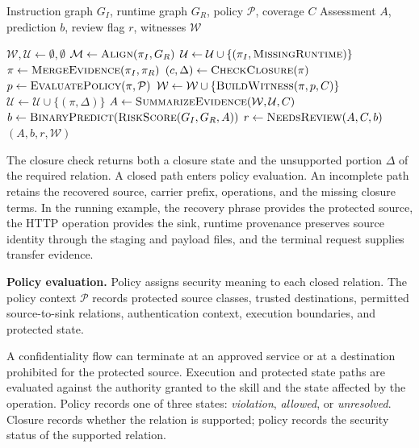 \begin{algorithm}[t]
\caption{\textsc{Adjudicate}$(G_I,G_R,\mathcal{P},C)$}
\label{alg:adjudication}
\footnotesize
\begin{algorithmic}[1]
\Require Instruction graph $G_I$, runtime graph $G_R$,
         policy $\mathcal{P}$, coverage $C$
\Ensure Assessment $A$, prediction $b$, review flag $r$,
        witnesses $\mathcal{W}$

\State $\mathcal{W},\mathcal{U} \gets \emptyset,\emptyset$
    \State $\mathcal{M} \gets \textsc{Align}(\pi_I,G_R)$
        \State $\mathcal{U} \gets \mathcal{U}\cup
        \{(\pi_I,\textsc{MissingRuntime})\}$
    \EndIf
        \State $\pi \gets \textsc{MergeEvidence}(\pi_I,\pi_R)$
        \State $(c,\Delta) \gets \textsc{CheckClosure}(\pi)$
            \State $p \gets \textsc{EvaluatePolicy}(\pi,\mathcal{P})$
            \State $\mathcal{W} \gets \mathcal{W}\cup
            \{\textsc{BuildWitness}(\pi,p,C)\}$
        \Else
            \State $\mathcal{U} \gets \mathcal{U}\cup\{(\pi,\Delta)\}$
        \EndIf
    \EndFor
\EndFor
\State $A \gets \textsc{SummarizeEvidence}(\mathcal{W},\mathcal{U},C)$
\State $b \gets \textsc{BinaryPredict}(\textsc{RiskScore}(G_I,G_R,A))$
\State $r \gets \textsc{NeedsReview}(A,C,b)$
\State \Return $(A,b,r,\mathcal{W})$
\end{algorithmic}
\end{algorithm}


The closure check returns both a closure state and the unsupported portion
$\Delta$ of the required relation. A closed path enters policy evaluation.
An incomplete path retains the recovered source, carrier prefix, operations,
and the missing closure terms. In the running example, the recovery phrase
provides the protected source, the HTTP operation provides the sink, runtime
provenance preserves source identity through the staging and payload files,
and the terminal request supplies transfer evidence.


\textbf{Policy evaluation.}
Policy assigns security meaning to each closed relation. The policy context
$\mathcal{P}$ records protected source classes, trusted destinations,
permitted source-to-sink relations, authentication context, execution
boundaries, and protected state.

A confidentiality flow can terminate at an approved service or at a
destination prohibited for the protected source. Execution and protected
state paths are evaluated against the authority granted to the skill and the
state affected by the operation. Policy records one of three states:
\emph{violation}, \emph{allowed}, or \emph{unresolved}. Closure records whether
the relation is supported; policy records the security status of the supported
relation.

